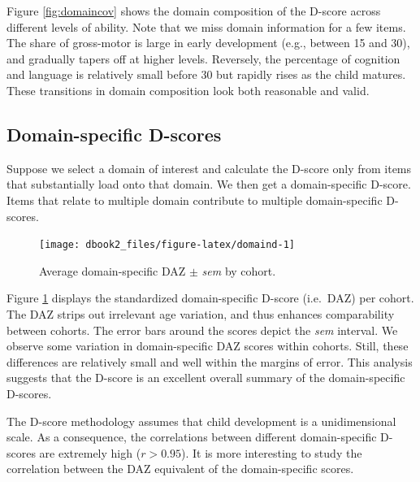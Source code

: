 \documentclass[
]{book}
\begin{document}
Figure \ref{fig:domaincov} shows the domain composition of the D-score across different levels of ability. Note that we miss domain information for a few items. The share of gross-motor is large in early development (e.g., between 15 and 30), and gradually tapers off at higher levels. Reversely, the percentage of cognition and language is relatively small before 30 but rapidly rises as the child matures. These transitions in domain composition look both reasonable and valid.

\hypertarget{domain-specific-d-scores}{%
\subsection{Domain-specific D-scores}\label{domain-specific-d-scores}}

Suppose we select a domain of interest and calculate the D-score only from items that substantially load onto that domain. We then get a domain-specific D-score. Items that relate to multiple domain contribute to multiple domain-specific D-scores.

\begin{figure}

{\centering \texttt{[image: dbook2\_files/figure-latex/domaind-1]} 

}

\caption{Average domain-specific DAZ \(\pm\) \emph{sem} by cohort.}\label{fig:domaind}
\end{figure}



Figure \ref{fig:domaind} displays the standardized domain-specific D-score (i.e.~DAZ) per cohort. The DAZ strips out irrelevant age variation, and thus enhances comparability between cohorts. The error bars around the scores depict the \emph{sem} interval. We observe some variation in domain-specific DAZ scores within cohorts. Still, these differences are relatively small and well within the margins of error. This analysis suggests that the D-score is an excellent overall summary of the domain-specific D-scores.

The D-score methodology assumes that child development is a unidimensional scale. As a consequence, the correlations between different domain-specific D-scores are extremely high (\(r > 0.95\)). It is more interesting to study the correlation between the DAZ equivalent of the domain-specific scores.
\end{document}
